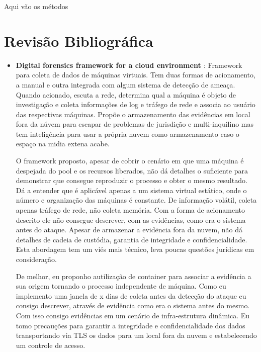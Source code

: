 \documentclass[
	12pt,				%
	openright,			%
	oneside,			%
	a4paper,			%
	english,			%
	french,				%
	spanish,			%
	brazil,				%
	]{abntex2}
\begin{document}
Aqui vão os métodos

\chapter{Revisão Bibliográfica}

\begin{itemize}

\item \textbf{Digital forensics framework for a cloud environment \cite{George2012} }: Framework para coleta de dados de máquinas virtuais. Tem duas formas de acionamento,
a manual e outra integrada com algum sistema de detecção de ameaça. Quando acionado, escuta a rede, determina qual a máquina é objeto de investigação e coleta informações de 
log e tráfego de rede e associa ao usuário das respectivas máquinas. Propõe o armazenamento das evidências em local fora da núvem para escapar de problemas de jurisdição e
multi-inquilino mas tem inteligência para usar a própria nuvem como armazenamento caso o espaço na midia extena acabe.

O framework proposto, apesar de cobrir o cenário em que uma máquina é despejada do pool e os recursos liberados, não dá detalhes o suficiente para demonstrar que consegue
reproduzir o processo e obter o mesmo resultado. Dá a entender que é aplicável apenas a um sistema virtual estático, onde o número e organização das máquinas é constante. 
De informação volátil, coleta apenas tráfego de rede, não coleta memória. Com a forma de acionamento descrito ele não consegue descrever, com as evidências, como era o 
sistema antes do ataque. Apesar de armazenar a evidëncia fora da nuvem, não dá detalhes de cadeia de custódia, garantia de integridade e confidencialidade. Esta abordagem 
tem um viés mais técnico, leva poucas questões jurídicas em consideração.

De melhor, eu proponho autilização de container para associar a evidência a sua origem tornando o processo independente de máquina. Como eu implemento uma janela de x dias
de coleta antes da detecção do ataque eu consigo descrever, através de evidência como era o sistema antes do mesmo. Com isso consigo evidências em um cenário
de infra-estrutura dinâmica. Eu tomo precauções para garantir a integridade e confidencialidade dos dados transportando via TLS os dados para um local fora da nuvem e 
estabelecendo um controle de acesso.\\
 

\end{itemize}
\end{document}
